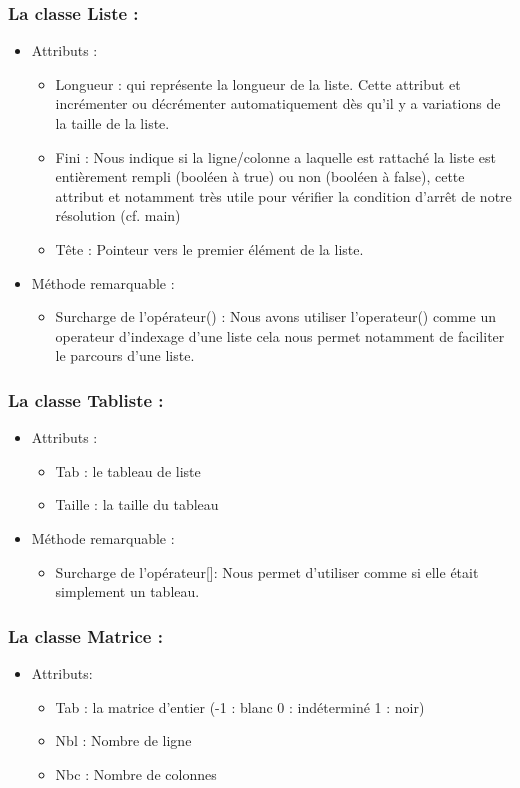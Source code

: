 \documentclass{article}
\begin{document}
\subsubsection{La classe Liste :}
\begin{itemize}
\item Attributs :
\begin{itemize}
\item Longueur : qui repr\'esente la longueur de la liste. Cette attribut et incr\'ementer ou d\'ecr\'ementer automatiquement d\`es qu'il y a variations de la taille de la
liste.
\item Fini : Nous indique si la ligne/colonne a laquelle est rattach\'e la liste est enti\`erement rempli (bool\'een \`a  true) ou non (bool\'een \`a  false), cette attribut et
notamment tr\`es utile pour v\'erifier la condition d'arrêt de notre r\'esolution (cf. main)
\item Tête : Pointeur vers le premier \'el\'ement de la liste.
\end{itemize}
\item M\'ethode remarquable :
\begin{itemize}
\item Surcharge de l'op\'erateur() : Nous avons utiliser l'operateur() comme un operateur d'indexage d'une liste cela nous permet notamment de faciliter le
parcours d'une liste.
\end{itemize}
\end{itemize}
\subsubsection{La classe Tabliste :}
\begin{itemize}
\item Attributs :
\begin{itemize}
\item Tab : le tableau de liste
\item Taille : la taille du tableau
\end{itemize}
\item M\'ethode remarquable :
\begin{itemize}
\item Surcharge de l'op\'erateur[]: Nous permet d'utiliser comme si elle \'etait simplement un tableau.
\end{itemize}
\end{itemize}
\subsubsection{La classe Matrice :}
\begin{itemize}
\item Attributs:
\begin{itemize}
\item Tab : la matrice d'entier (-1 : blanc 0 : ind\'etermin\'e 1 : noir)
\item Nbl : Nombre de ligne
\item Nbc : Nombre de colonnes
\end{itemize}
\end{itemize}
\end{document}
